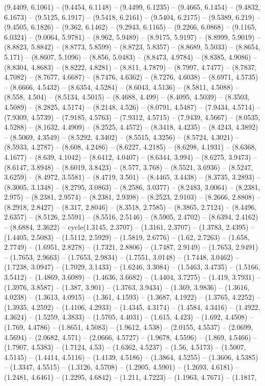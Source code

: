 (9.4409, 6.1061) -- (9.4454, 6.1148) -- (9.4499, 6.1235) -- (9.4665, 6.1454) -- (9.4832, 6.1673) -- (9.5125, 6.1917) -- (9.5418, 6.2161) -- (9.5404, 6.2175) -- (9.5389, 6.219) -- (9.4505, 6.1826) -- (9.362, 6.1462) -- (9.2943, 6.1165) -- (9.2266, 6.0868) -- (9.1165, 6.0324) -- (9.0064, 5.9781) -- (8.962, 5.9489) -- (8.9175, 5.9197) -- (8.8999, 5.9019) -- (8.8823, 5.8842) -- (8.8773, 5.8599) -- (8.8723, 5.8357) -- (8.8689, 5.5033) -- (8.8654, 5.171) -- (8.8607, 5.1096) -- (8.856, 5.0483) -- (8.8473, 4.9784) -- (8.8385, 4.9086) -- (8.8304, 4.8683) -- (8.8222, 4.8281) -- (8.811, 4.7879) -- (8.7997, 4.7477) -- (8.7837, 4.7082) -- (8.7677, 4.6687) -- (8.7476, 4.6362) -- (8.7276, 4.6038) -- (8.6971, 4.5735) -- (8.6666, 4.5432) -- (8.6354, 4.5284) -- (8.6043, 4.5136) -- (8.5811, 4.5088) -- (8.558, 4.504) -- (8.5134, 4.5015) -- (8.4688, 4.499) -- (8.4095, 4.5039) -- (8.3503, 4.5089) -- (8.2825, 4.5174) -- (8.2148, 4.526) -- (8.0791, 4.5487) -- (7.9434, 4.5714) -- (7.9309, 4.5739) -- (7.9185, 4.5763) -- (7.9312, 4.5715) -- (7.9439, 4.5667) -- (8.0535, 4.5288) -- (8.1632, 4.4909) -- (8.2525, 4.4572) -- (8.3418, 4.4235) -- (8.4243, 4.3892) -- (8.5069, 4.3549) -- (8.5292, 4.3402) -- (8.5515, 4.3256) -- (8.5724, 4.3021) -- (8.5933, 4.2787) -- (8.608, 4.2486) -- (8.6227, 4.2185) -- (8.6298, 4.1931) -- (8.6368, 4.1677) -- (8.639, 4.1042) -- (8.6412, 4.0407) -- (8.6344, 3.994) -- (8.6275, 3.9473) -- (8.6147, 3.8948) -- (8.6019, 3.8423) -- (8.577, 3.768) -- (8.5521, 3.6936) -- (8.5247, 3.6259) -- (8.4972, 3.5581) -- (8.4719, 3.501) -- (8.4465, 3.4438) -- (8.3735, 3.2893) -- (8.3005, 3.1348) -- (8.2795, 3.0863) -- (8.2586, 3.0377) -- (8.2483, 3.0064) -- (8.2381, 2.975) -- (8.2381, 2.9574) -- (8.2381, 2.9398) -- (8.2523, 2.9103) -- (8.2666, 2.8808) -- (8.2918, 2.8427) -- (8.317, 2.8046) -- (8.3518, 2.7585) -- (8.3865, 2.7124) -- (8.4496, 2.6357) -- (8.5126, 2.5591) -- (8.5516, 2.5146) -- (8.5905, 2.4702) -- (8.6394, 2.4162) -- (8.6884, 2.3622) -- cycle(1.3145, 2.3707) -- (1.3161, 2.3707) -- (1.3783, 2.4395) -- (1.4405, 2.5083) -- (1.5112, 2.5929) -- (1.5819, 2.6776) -- (1.62, 2.7263) -- (1.658, 2.7749) -- (1.6951, 2.8278) -- (1.7321, 2.8806) -- (1.7487, 2.9149) -- (1.7653, 2.9491) -- (1.7653, 2.9663) -- (1.7653, 2.9834) -- (1.7551, 3.0148) -- (1.7448, 3.0462) -- (1.7238, 3.0947) -- (1.7029, 3.1433) -- (1.6246, 3.3084) -- (1.5463, 3.4735) -- (1.5166, 3.5412) -- (1.4869, 3.6089) -- (1.4636, 3.6682) -- (1.4404, 3.7275) -- (1.419, 3.7931) -- (1.3976, 3.8587) -- (1.387, 3.901) -- (1.3763, 3.9434) -- (1.369, 3.9836) -- (1.3616, 4.0238) -- (1.3613, 4.0915) -- (1.361, 4.1593) -- (1.3687, 4.1922) -- (1.3765, 4.2252) -- (1.3935, 4.2592) -- (1.4106, 4.2933) -- (1.4345, 4.3174) -- (1.4584, 4.3416) -- (1.4922, 4.3624) -- (1.5259, 4.3833) -- (1.5705, 4.4031) -- (1.615, 4.423) -- (1.692, 4.4508) -- (1.769, 4.4786) -- (1.8651, 4.5083) -- (1.9612, 4.538) -- (2.0155, 4.5537) -- (2.0699, 4.5694) -- (2.0682, 4.571) -- (2.0666, 4.5727) -- (1.9678, 4.5596) -- (1.869, 4.5466) -- (1.7907, 4.5383) -- (1.7124, 4.53) -- (1.6362, 4.5237) -- (1.56, 4.5173) -- (1.5007, 4.5145) -- (1.4414, 4.5116) -- (1.4139, 4.5186) -- (1.3864, 4.5255) -- (1.3606, 4.5385) -- (1.3347, 4.5515) -- (1.3126, 4.5708) -- (1.2905, 4.5901) -- (1.2693, 4.6181) -- (1.2481, 4.6461) -- (1.2295, 4.6842) -- (1.211, 4.7223) -- (1.1963, 4.7671) -- (1.1817, 